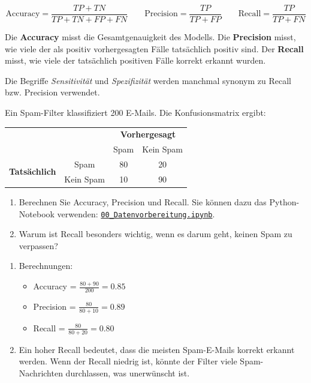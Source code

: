 \begin{mydefinition}
\[
\text{Accuracy} = \frac{TP + TN}{TP + TN + FP + FN}
\qquad
\text{Precision} = \frac{TP}{TP + FP}
\qquad
\text{Recall} = \frac{TP}{TP + FN}
\]

Die \textbf{Accuracy} misst die Gesamtgenauigkeit des Modells.
Die \textbf{Precision} misst, wie viele der als positiv vorhergesagten Fälle tatsächlich positiv sind.
Der \textbf{Recall} misst, wie viele der tatsächlich positiven Fälle korrekt erkannt wurden.

Die Begriffe \emph{Sensitivität} und \emph{Spezifizität} werden manchmal synonym zu Recall bzw. Precision verwendet.
\end{mydefinition}

\begin{myexercise}
Ein Spam-Filter klassifiziert 200 E-Mails.
Die Konfusionsmatrix ergibt: 
\begin{center}
\begin{tabular}{cc|cc}
 & & \multicolumn{2}{c}{\textbf{Vorhergesagt}} \\
 & & Spam & Kein Spam \\
\hline
\multirow{2}{*}{\textbf{Tatsächlich}} & Spam & 80 & 20 \\
 & Kein Spam & 10 & 90 \\
\end{tabular}
\end{center}

\begin{enumerate}
    \item Berechnen Sie Accuracy, Precision und Recall. Sie können dazu das Python-Notebook verwenden: \href{\notebookbaseurl00_Datenvorbereitung.ipynb}{\texttt{00\_Datenvorbereitung.ipynb}}.
    \item Warum ist Recall besonders wichtig, wenn es darum geht, keinen Spam zu verpassen?
\end{enumerate}
\begin{myanswer}
\begin{enumerate}
    \item Berechnungen:
    \begin{itemize}
        \item Accuracy = $\frac{80 + 90}{200} = 0.85$
        \item Precision = $\frac{80}{80 + 10} = 0.89$
        \item Recall = $\frac{80}{80 + 20} = 0.80$
    \end{itemize}
    \item Ein hoher Recall bedeutet, dass die meisten Spam-E-Mails korrekt erkannt werden. Wenn der Recall niedrig ist, könnte der Filter viele Spam-Nachrichten durchlassen, was unerwünscht ist.
\end{enumerate}
\end{myanswer}
\end{myexercise}